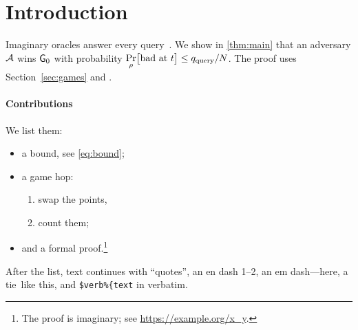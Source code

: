 \section{Introduction}\label{sec:intro}

Imaginary oracles answer every query~\cite{FakeA20,FakeB21}. We show in \cref{thm:main} that an adversary $\mathcal{A}$ wins $\mathsf{G}_{0}$ with probability $\Pr\limits_{\rho}\!\big[\text{bad at $t$}\big]\le q_{\mathrm{query}}/N$.
The proof uses Section~\ref{sec:games} and .

\paragraph{Contributions}
We list them:
\begin{itemize}
  \item a bound, see \eqref{eq:bound};
  \item a game hop:
  \begin{enumerate}
    \item swap the points,
    \item count them;
  \end{enumerate}
  \item and a formal proof.\footnote{The proof is imaginary; see \url{https://example.org/x_y}.}
\end{itemize}
After the list, text continues with ``quotes'', an en dash 1--2, an em dash---here, a tie~like this, and \verb|$verb%{text| in verbatim.
